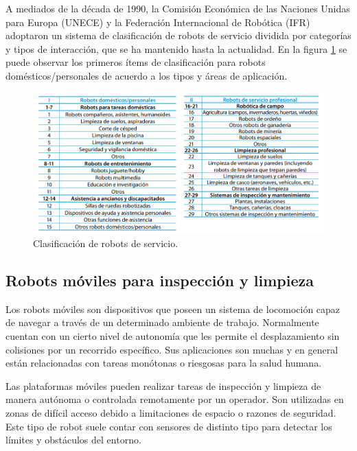 A mediados de la década de 1990, la Comisión Económica de las Naciones Unidas para Europa (UNECE) \citep{UNECE} y la Federación Internacional de Robótica (IFR) \citep{IFR} adoptaron un sistema de clasificación de robots de servicio dividida por categorías y tipos de interacción, que se ha mantenido hasta la actualidad. En la  figura \ref{fig:clasificacion} se puede observar los primeros ítems de clasificación para robots domésticos/personales de acuerdo a los tipos y áreas de aplicación.
\pagebreak

\begin{figure}[h]
	\centering
	\includegraphics[width=\textwidth]{./Figures/clasificacion.png}
	\caption{Clasificación de robots de servicio\protect\footnotemark.}
	\label{fig:clasificacion}
\end{figure}




\subsection{Robots móviles para inspección y limpieza}

Los robots móviles son dispositivos que poseen un sistema de locomoción capaz de navegar a través de un determinado ambiente de trabajo. Normalmente cuentan con un cierto nivel de autonomía que les permite el desplazamiento sin colisiones por un recorrido específico. Sus aplicaciones son muchas y en general  están relacionadas con tareas monótonas o riesgosas para la salud humana\citep{whatare}.

Las plataformas móviles pueden realizar tareas de inspección y limpieza de manera autónoma o controlada remotamente por un operador. Son utilizadas en zonas de difícil acceso debido a limitaciones de espacio o razones de seguridad. Este tipo de robot suele contar con sensores de distinto tipo para detectar los límites y obstáculos del entorno.
 
